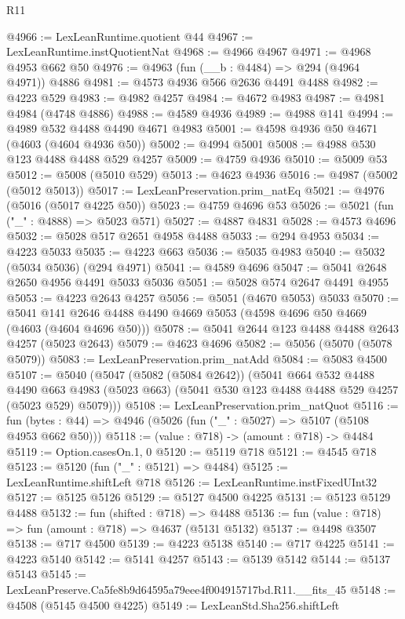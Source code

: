 \begin{lexlean}{R11}
\begin{coremodule}
@4966 := LexLeanRuntime.quotient @44
@4967 := LexLeanRuntime.instQuotientNat
@4968 := @4966 @4967
@4971 := @4968 @4953 @662 @50
@4976 := @4963 (fun (__b : @4484) => @294 (@4964 @4971)) @4886
@4981 := @4573 @4936 @566 @2636 @4491 @4488
@4982 := @4223 @529
@4983 := @4982 @4257
@4984 := @4672 @4983
@4987 := @4981 @4984 (@4748 @4886)
@4988 := @4589 @4936
@4989 := @4988 @141
@4994 := @4989 @532 @4488 @4490 @4671 @4983
@5001 := @4598 @4936 @50 @4671 (@4603 (@4604 @4936 @50))
@5002 := @4994 @5001
@5008 := @4988 @530 @123 @4488 @4488 @529 @4257
@5009 := @4759 @4936
@5010 := @5009 @53
@5012 := @5008 (@5010 @529)
@5013 := @4623 @4936
@5016 := @4987 (@5002 (@5012 @5013))
@5017 := LexLeanPreservation.prim_natEq
@5021 := @4976 (@5016 (@5017 @4225 @50))
@5023 := @4759 @4696 @53
@5026 := @5021 (fun ("_" : @4888) => @5023 @571)
@5027 := @4887 @4831
@5028 := @4573 @4696
@5032 := @5028 @517 @2651 @4958 @4488
@5033 := @294 @4953
@5034 := @4223 @5033
@5035 := @4223 @663
@5036 := @5035 @4983
@5040 := @5032 (@5034 @5036) (@294 @4971)
@5041 := @4589 @4696
@5047 := @5041 @2648 @2650 @4956 @4491 @5033 @5036
@5051 := @5028 @574 @2647 @4491 @4955
@5053 := @4223 @2643 @4257
@5056 := @5051 (@4670 @5053) @5033
@5070 := @5041 @141 @2646 @4488 @4490 @4669 @5053 (@4598 @4696 @50 @4669 (@4603 (@4604 @4696 @50)))
@5078 := @5041 @2644 @123 @4488 @4488 @2643 @4257 (@5023 @2643)
@5079 := @4623 @4696
@5082 := @5056 (@5070 (@5078 @5079))
@5083 := LexLeanPreservation.prim_natAdd
@5084 := @5083 @4500
@5107 := @5040
    (@5047
      (@5082 (@5084 @2642))
      (@5041
        @664
        @532
        @4488
        @4490
        @663
        @4983
        (@5023 @663)
        (@5041 @530 @123 @4488 @4488 @529 @4257 (@5023 @529) @5079)))
@5108 := LexLeanPreservation.prim_natQuot
@5116 := fun (bytes : @44) => @4946 (@5026 (fun ("_" : @5027) => @5107 (@5108 @4953 @662 @50)))
@5118 := (value : @718) -> (amount : @718) -> @4484
@5119 := Option.casesOn.{1, 0}
@5120 := @5119 @718
@5121 := @4545 @718
@5123 := @5120 (fun ("_" : @5121) => @4484)
@5125 := LexLeanRuntime.shiftLeft @718
@5126 := LexLeanRuntime.instFixedUInt32
@5127 := @5125 @5126
@5129 := @5127 @4500 @4225
@5131 := @5123 @5129 @4488
@5132 := fun (shifted : @718) => @4488
@5136 := fun (value : @718) => fun (amount : @718) => @4637 (@5131 @5132)
@5137 := @4498 @3507
@5138 := @717 @4500
@5139 := @4223 @5138
@5140 := @717 @4225
@5141 := @4223 @5140
@5142 := @5141 @4257
@5143 := @5139 @5142
@5144 := @5137 @5143
@5145 := LexLeanPreserve.Ca5fe8b9d64595a79eee4f004915717bd.R11.__fits_45
@5148 := @4508 (@5145 @4500 @4225)
@5149 := LexLeanStd.Sha256.shiftLeft

\end{coremodule}
\end{lexlean}
